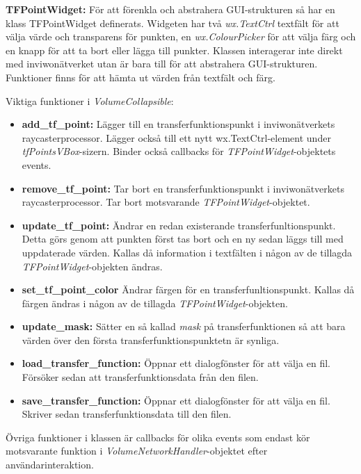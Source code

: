 \textbf{TFPointWidget: } För att förenkla och abstrahera GUI-strukturen så har en klass TFPointWidget definerats. Widgeten har två \textit{wx.TextCtrl} textfält för att välja värde och transparens för punkten, en \textit{wx.ColourPicker} för att välja färg och en knapp för att ta bort eller lägga till punkter. Klassen interagerar inte direkt med inviwonätverket utan är bara till för att abstrahera GUI-strukturen. Funktioner finns för att hämta ut värden från textfält och färg.


Viktiga funktioner i \textit{VolumeCollapsible}:
\begin{itemize}
    \setlength\itemsep{0em}
    \item \textbf{add\_tf\_point: } Lägger till en transferfunktionspunkt i inviwonätverkets raycasterprocessor. Lägger också till ett nytt wx.TextCtrl-element under \textit{tfPointsVBox}-sizern. Binder också callbacks för \textit{TFPointWidget}-objektets events. 
    \item \textbf{remove\_tf\_point: } Tar bort en transferfunktionspunkt i inviwonätverkets raycasterprocessor. Tar bort motsvarande \textit{TFPointWidget}-objektet.
    \item \textbf{update\_tf\_point: } Ändrar en redan existerande transferfunltionspunkt. Detta görs genom att punkten först tas bort och en ny sedan läggs till med uppdaterade värden. Kallas då information i textfälten i någon av de tillagda \textit{TFPointWidget}-objekten ändras.
    \item \textbf{set\_tf\_point\_color} Ändrar färgen för en transferfunltionspunkt. Kallas då färgen ändras i någon av de tillagda \textit{TFPointWidget}-objekten.
    \item \textbf{update\_mask: } Sätter en så kallad \textit{mask} på transferfunktionen så att bara värden över den första transferfunktionspunktetn är synliga.
    \item \textbf{load\_transfer\_function: } Öppnar ett dialogfönster för att välja en fil. Försöker sedan att transferfunktionsdata från den filen. 
    \item \textbf{save\_transfer\_function: } Öppnar ett dialogfönster för att välja en fil. Skriver sedan transferfunktionsdata till den filen.
\end{itemize}

Övriga funktioner i klassen är callbacks för olika events som endast kör motsvarante funktion i  \textit{VolumeNetworkHandler}-objektet efter användarinteraktion.

